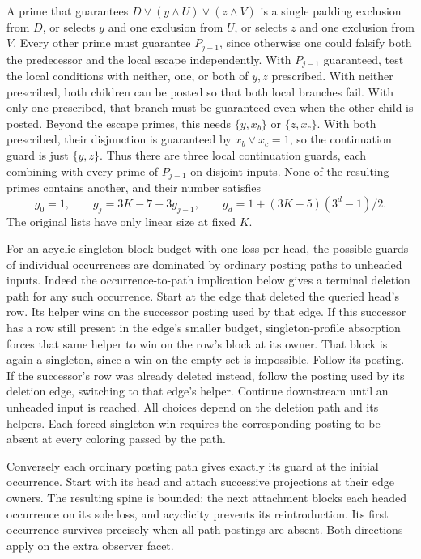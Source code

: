 A prime that guarantees $D\vee(y\wedge U)\vee(z\wedge V)$
is a single padding exclusion from $D$, or selects $y$
and one exclusion from $U$, or selects $z$ and one
exclusion from $V$. Every other prime must guarantee
$P_{j-1}$, since otherwise one could falsify both the
predecessor and the local escape independently.
With $P_{j-1}$ guaranteed, test the local conditions
with neither, one, or both of $y,z$ prescribed. With
neither prescribed, both children can be posted so
that both local branches fail. With only one prescribed,
that branch must be guaranteed even when the other
child is posted. Beyond the escape primes, this needs
$\{y,x_b\}$ or $\{z,x_c\}$. With both prescribed, their
disjunction is guaranteed by $x_b\vee x_c=1$, so the
continuation guard is just $\{y,z\}$. Thus there are
three local continuation guards, each combining with
every prime of $P_{j-1}$ on disjoint inputs.
None of the resulting primes contains another, and
their number satisfies
\[
     g_0=1,\qquad g_j=3K-7+3g_{j-1},\qquad
     g_d=1+(3K-5)(3^d-1)/2.
\]
The original lists have only linear size at fixed $K$.

For an acyclic singleton-block budget with one loss per
head, the possible guards of individual occurrences are
dominated by ordinary posting paths to unheaded inputs.
Indeed the occurrence-to-path implication below gives
a terminal deletion path for any such occurrence. Start
at the edge that deleted the queried head's row. Its
helper wins on the successor posting used by that edge.
If this successor has a row still present in the edge's
smaller budget, singleton-profile absorption forces
that same helper to win on the row's block at its
owner. That block is again a singleton, since a win
on the empty set is impossible. Follow its posting.
If the successor's row was already deleted instead,
follow the posting used by its deletion edge, switching
to that edge's helper. Continue downstream until an
unheaded input is reached. All choices depend on the
deletion path and its helpers. Each forced singleton
win requires the corresponding posting to be absent
at every coloring passed by the path.

Conversely each ordinary posting path gives exactly its
guard at the initial occurrence. Start with its head
and attach successive projections at their edge
owners. The resulting spine is bounded: the next
attachment blocks each headed occurrence on its
sole loss, and acyclicity prevents its reintroduction.
Its first occurrence survives precisely when all path
postings are absent. Both directions apply on the
extra observer facet.

